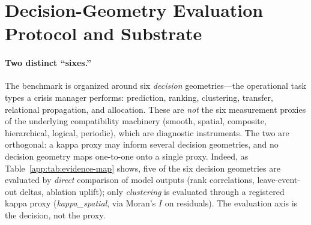 %
%
%


\section{Decision-Geometry Evaluation Protocol and Substrate}
\label{app:protocol-substrate}

\paragraph{Two distinct ``sixes.''}
The benchmark is organized around six \emph{decision} geometries---the
operational task types a crisis manager performs: prediction, ranking,
clustering, transfer, relational propagation, and allocation. These are
\emph{not} the six measurement proxies of the underlying compatibility
machinery (smooth, spatial, composite, hierarchical, logical, periodic),
which are diagnostic instruments. The two are orthogonal: a kappa proxy
may inform several decision geometries, and no decision geometry maps
one-to-one onto a single proxy. Indeed, as
Table~\ref{app:tab:evidence-map} shows, five of the six decision
geometries are evaluated by \emph{direct} comparison of model outputs
(rank correlations, leave-event-out deltas, ablation uplift); only
\emph{clustering} is evaluated through a registered kappa proxy
(\textit{kappa\_spatial}, via Moran's $I$ on residuals). The evaluation
axis is the decision, not the proxy.

